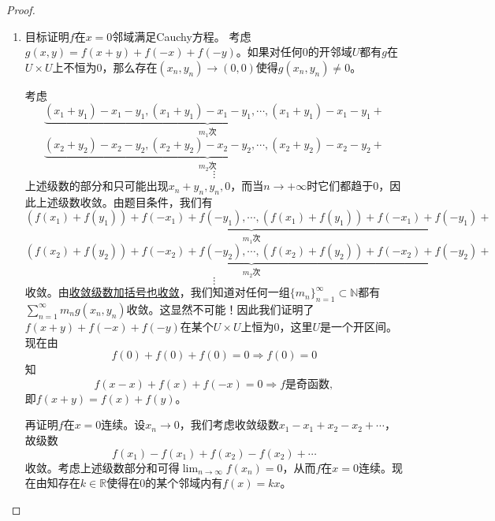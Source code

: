\documentclass[../../main.tex]{subfiles}
\begin{document}
\begin{proof}
\begin{enumerate}
\item 目标证明$f$在$x=0$邻域满足Cauchy方程。
考虑$g(x,y)=f(x+y)+f(-x)+f(-y)$。如果对任何$0$的开邻域$U$都有$g$在$U\times U$上不恒为$0$，那么存在$(x_n,y_n)\to(0,0)$使得$g(x_n,y_n)\neq0$。

考虑
\[
\underbrace{(x_1+y_1)-x_1-y_1,(x_1+y_1)-x_1-y_1,\cdots,(x_1+y_1)-x_1-y_1}_{m_1次}+
\]
\[
\underbrace{(x_2+y_2)-x_2-y_2,(x_2+y_2)-x_2-y_2,\cdots,(x_2+y_2)-x_2-y_2}_{m_2次}+
\]
\[
\vdots
\]
上述级数的部分和只可能出现$x_n+y_n,y_n,0$，而当$n\to+\infty$时它们都趋于$0$，因此上述级数收敛。由题目条件，我们有
\[
\underbrace{(f(x_1)+f(y_1))+f(-x_1)+f(-y_1),\cdots,(f(x_1)+f(y_1))+f(-x_1)+f(-y_1)}_{m_1次}+
\]
\[
\underbrace{(f(x_2)+f(y_2))+f(-x_2)+f(-y_2),\cdots,(f(x_2)+f(y_2))+f(-x_2)+f(-y_2)}_{m_2次}+
\]
\[
\vdots
\]
收敛。由\hyperref[theorem:级数加括号的理解]{收敛级数加括号也收敛}，我们知道对任何一组$\{m_n\}_{n=1}^{\infty}\subset\mathbb{N}$都有$\sum_{n=1}^{\infty}m_ng(x_n,y_n)$收敛。这显然不可能！因此我们证明了$f(x+y)+f(-x)+f(-y)$在某个$U\times U$上恒为$0$，这里$U$是一个开区间。现在由
\[
f(0)+f(0)+f(0)=0\Rightarrow f(0)=0
\]
知
\[
f(x-x)+f(x)+f(-x)=0\Rightarrow f\text{是奇函数},
\]
即$f(x+y)=f(x)+f(y)$。

再证明$f$在$x=0$连续。设$x_n\to0$，我们考虑收敛级数$x_1-x_1+x_2-x_2+\cdots$，故级数
\[
f(x_1)-f(x_1)+f(x_2)-f(x_2)+\cdots
\]
收敛。考虑上述级数部分和可得$\lim_{n\to\infty}f(x_n)=0$，从而$f$在$x=0$连续。现在由知存在$k\in\mathbb{R}$使得在$0$的某个邻域内有$f(x)=kx$。
\end{enumerate}
\end{proof}
\end{document}
